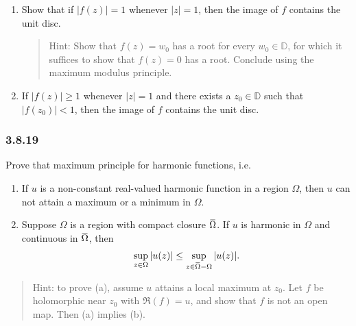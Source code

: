 \begin{enumerate}
\def\labelenumi{\alph{enumi}.}
\item
  Show that if \({\left\lvert {f(z)} \right\rvert} = 1\) whenever
  \({\left\lvert {z} \right\rvert} = 1\), then the image of \(f\)
  contains the unit disc.

  \begin{quote}
  Hint: Show that \(f(z) = w_0\) has a root for every
  \(w_0 \in {\mathbb{D}}\), for which it suffices to show that
  \(f(z) = 0\) has a root. Conclude using the maximum modulus principle.
  \end{quote}
\item
  If \({\left\lvert {f(z)} \right\rvert} \geq 1\) whenever
  \({\left\lvert {z} \right\rvert} = 1\) and there exists a
  \(z_0\in {\mathbb{D}}\) such that
  \({\left\lvert {f(z_0)} \right\rvert} < 1\), then the image of \(f\)
  contains the unit disc.
\end{enumerate}

\hypertarget{section-72}{%
\subsubsection{3.8.19}\label{section-72}}

Prove that maximum principle for harmonic functions, i.e.

\begin{enumerate}
\def\labelenumi{\alph{enumi}.}
\item
  If \(u\) is a non-constant real-valued harmonic function in a region
  \(\Omega\), then \(u\) can not attain a maximum or a minimum in
  \(\Omega\).
\item
  Suppose \(\Omega\) is a region with compact closure
  \(\mkern 1.5mu\overline{\mkern-1.5mu\Omega\mkern-1.5mu}\mkern 1.5mu\).
  If \(u\) is harmonic in \(\Omega\) and continuous in
  \(\mkern 1.5mu\overline{\mkern-1.5mu\Omega\mkern-1.5mu}\mkern 1.5mu\),
  then
  \begin{align*}
   \sup _{z \in \Omega}|u(z)| \leq \sup _{z \in \mkern 1.5mu\overline{\mkern-1.5mu\Omega \mkern-1.5mu}\mkern 1.5mu-\Omega}|u(z)|
   .\end{align*}
\end{enumerate}

\begin{quote}
Hint: to prove (a), assume \(u\) attains a local maximum at \(z_0\). Let
\(f\) be holomorphic near \(z_0\) with \(\Re(f) = u\), and show that
\(f\) is not an open map. Then (a) implies (b).
\end{quote}

